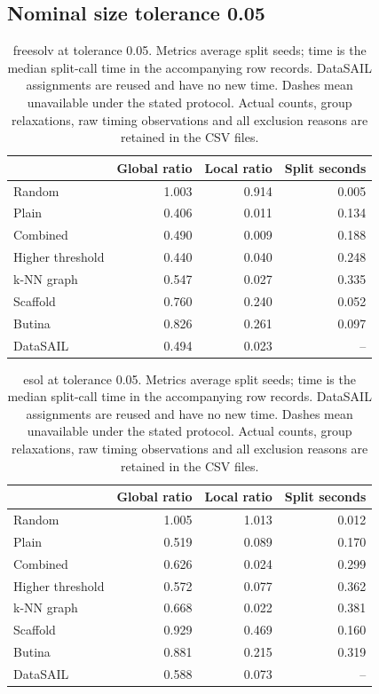 \subsection*{Nominal size tolerance 0.05}
\begin{table}[htbp]\centering\small
\begin{tabular}{lrrr}
\toprule
 & Global ratio & Local ratio & Split seconds \\
\midrule
Random & 1.003 & 0.914 & 0.005 \\
Plain & 0.406 & 0.011 & 0.134 \\
Combined & 0.490 & 0.009 & 0.188 \\
Higher threshold & 0.440 & 0.040 & 0.248 \\
k-NN graph & 0.547 & 0.027 & 0.335 \\
Scaffold & 0.760 & 0.240 & 0.052 \\
Butina & 0.826 & 0.261 & 0.097 \\
DataSAIL & 0.494 & 0.023 & -- \\
\bottomrule
\end{tabular}

\caption{freesolv at tolerance 0.05. Metrics average split seeds; time is the median split-call time in the accompanying row records. DataSAIL assignments are reused and have no new time. Dashes mean unavailable under the stated protocol. Actual counts, group relaxations, raw timing observations and all exclusion reasons are retained in the CSV files.}\end{table}
\begin{table}[htbp]\centering\small
\begin{tabular}{lrrr}
\toprule
 & Global ratio & Local ratio & Split seconds \\
\midrule
Random & 1.005 & 1.013 & 0.012 \\
Plain & 0.519 & 0.089 & 0.170 \\
Combined & 0.626 & 0.024 & 0.299 \\
Higher threshold & 0.572 & 0.077 & 0.362 \\
k-NN graph & 0.668 & 0.022 & 0.381 \\
Scaffold & 0.929 & 0.469 & 0.160 \\
Butina & 0.881 & 0.215 & 0.319 \\
DataSAIL & 0.588 & 0.073 & -- \\
\bottomrule
\end{tabular}

\caption{esol at tolerance 0.05. Metrics average split seeds; time is the median split-call time in the accompanying row records. DataSAIL assignments are reused and have no new time. Dashes mean unavailable under the stated protocol. Actual counts, group relaxations, raw timing observations and all exclusion reasons are retained in the CSV files.}\end{table}
